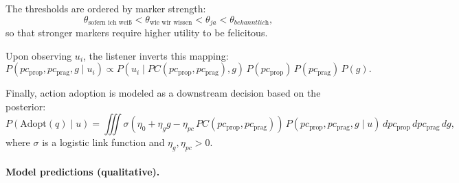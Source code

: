 \documentclass[12pt]{article}
\begin{document}

The thresholds are ordered by marker strength:
\[
\theta_{\text{sofern ich wei\ss}}
<
\theta_{\text{wie wir wissen}}
<
\theta_{\textit{ja}}
<
\theta_{\textit{bekanntlich}},
\]
so that stronger markers require higher utility to be felicitous.

Upon observing $u_i$, the listener inverts this mapping:
\begin{equation}
P(pc_{\text{prop}}, pc_{\text{prag}}, g \mid u_i)
\propto
P(u_i \mid PC(pc_{\text{prop}}, pc_{\text{prag}}), g)\,
P(pc_{\text{prop}})\,P(pc_{\text{prag}})\,P(g).
\end{equation}

Finally, action adoption is modeled as a downstream decision based on the posterior:
\begin{equation}
P(\mathrm{Adopt}(q) \mid u)
=
\iiint
\sigma(\eta_0 + \eta_g g - \eta_{pc} \, PC(pc_{\text{prop}}, pc_{\text{prag}}))
\, P(pc_{\text{prop}}, pc_{\text{prag}}, g \mid u)
\, dpc_{\text{prop}}\, dpc_{\text{prag}}\, dg,
\end{equation}
where $\sigma$ is a logistic link function and $\eta_g, \eta_{pc} > 0$.

\paragraph{Model predictions (qualitative).}
\end{document}
